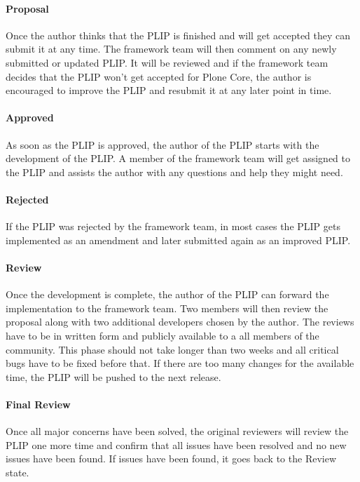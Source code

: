 \paragraph{Proposal}

Once the author thinks that the \ac{PLIP} is finished and will get accepted
they can submit it at any time. The framework team will then comment on any
newly submitted or updated \ac{PLIP}. It will be reviewed and if the framework
team decides that the \ac{PLIP} won't get accepted for Plone Core, the author
is encouraged to improve the \ac{PLIP} and resubmit it at any later point in
time.

\paragraph{Approved}

As soon as the \ac{PLIP} is approved, the author of the \ac{PLIP} starts with
the development of the \ac{PLIP}. A member of the framework team will get
assigned to the \ac{PLIP} and assists the author with any questions and help
they might need.

\paragraph{Rejected}

If the \ac{PLIP} was rejected by the framework team, in most cases the
\ac{PLIP} gets implemented as an amendment and later submitted again as an
improved \ac{PLIP}.

\paragraph{Review}

Once the development is complete, the author of the \ac{PLIP} can forward the
implementation to the framework team. Two members will then review the proposal
along with two additional developers chosen by the author. The reviews have to
be in written form and publicly available to a all members of the community.
This phase should not take longer than two weeks and all critical bugs have to
be fixed before that. If there are too many changes for the available time, the
\ac{PLIP} will be pushed to the next release.

\paragraph{Final Review}

Once all major concerns have been solved, the original reviewers will review
the \ac{PLIP} one more time and confirm that all issues have been resolved and
no new issues have been found. If issues have been found, it goes back to the
Review state.

